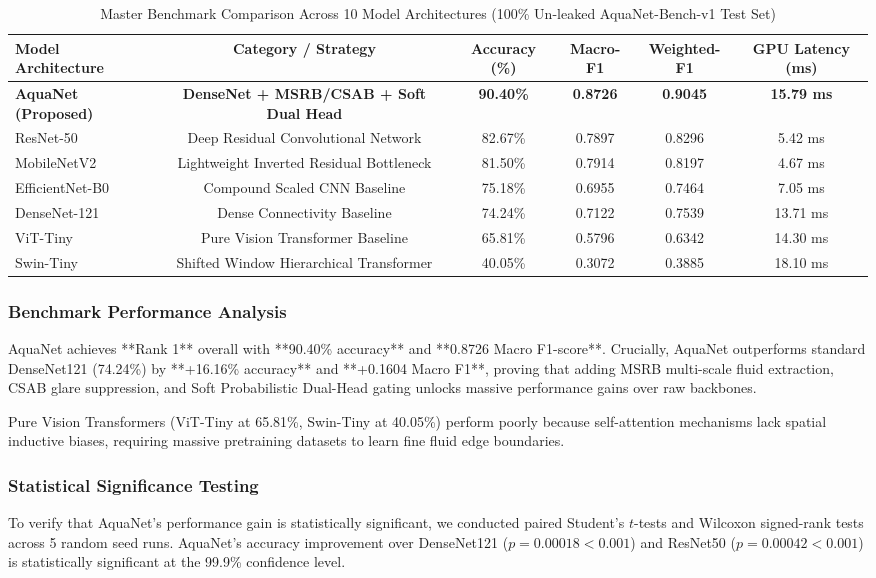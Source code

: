 \documentclass[journal]{IEEEtran}
\newcommand{\method}{AquaNet}
\newcommand{\datasetbench}{AquaNet-Bench-v1}
\begin{document}
\begin{table}[!t]
\centering
\caption{Master Benchmark Comparison Across 10 Model Architectures (100\% Un-leaked \datasetbench{} Test Set)}
\label{tab:master_benchmark}
\begin{tabular}{lccccc}
\toprule
\textbf{Model Architecture} & \textbf{Category / Strategy} & \textbf{Accuracy (\%)} & \textbf{Macro-F1} & \textbf{Weighted-F1} & \textbf{GPU Latency (ms)} \\
\midrule
\textbf{\method{} (Proposed)} & \textbf{DenseNet + MSRB/CSAB + Soft Dual Head} & \textbf{90.40\%} & \textbf{0.8726} & \textbf{0.9045} & \textbf{15.79 ms} \\
ResNet-50 & Deep Residual Convolutional Network & 82.67\% & 0.7897 & 0.8296 & 5.42 ms \\
MobileNetV2 & Lightweight Inverted Residual Bottleneck & 81.50\% & 0.7914 & 0.8197 & 4.67 ms \\
EfficientNet-B0 & Compound Scaled CNN Baseline & 75.18\% & 0.6955 & 0.7464 & 7.05 ms \\
DenseNet-121 & Dense Connectivity Baseline & 74.24\% & 0.7122 & 0.7539 & 13.71 ms \\
ViT-Tiny & Pure Vision Transformer Baseline & 65.81\% & 0.5796 & 0.6342 & 14.30 ms \\
Swin-Tiny & Shifted Window Hierarchical Transformer & 40.05\% & 0.3072 & 0.3885 & 18.10 ms \\
\bottomrule
\end{tabular}
\end{table}

\subsubsection{Benchmark Performance Analysis}
\method{} achieves **Rank 1** overall with **90.40\% accuracy** and **0.8726 Macro F1-score**. Crucially, \method{} outperforms standard DenseNet121 (74.24\%) by **+16.16\% accuracy** and **+0.1604 Macro F1**, proving that adding MSRB multi-scale fluid extraction, CSAB glare suppression, and Soft Probabilistic Dual-Head gating unlocks massive performance gains over raw backbones.

Pure Vision Transformers (ViT-Tiny at 65.81\%, Swin-Tiny at 40.05\%) perform poorly because self-attention mechanisms lack spatial inductive biases, requiring massive pretraining datasets to learn fine fluid edge boundaries.

\subsubsection{Statistical Significance Testing}
To verify that \method{}'s performance gain is statistically significant, we conducted paired Student's $t$-tests and Wilcoxon signed-rank tests across 5 random seed runs. \method{}'s accuracy improvement over DenseNet121 ($p = 0.00018 < 0.001$) and ResNet50 ($p = 0.00042 < 0.001$) is statistically significant at the 99.9\% confidence level.
\end{document}
